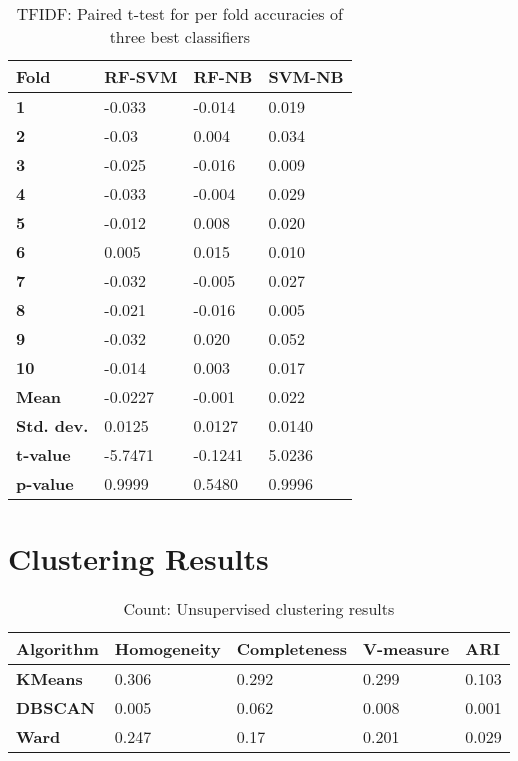 \documentclass{article}
\begin{document}
\begin{table}[h]
\begin{tabular}{llll}
\textbf{Fold}      & \textbf{RF-SVM} & \textbf{RF-NB} & \textbf{SVM-NB} \\ \hline
\textbf{1}         & -0.033          & -0.014         & 0.019           \\
\textbf{2}         & -0.03           & 0.004          & 0.034           \\
\textbf{3}         & -0.025          & -0.016         & 0.009           \\
\textbf{4}         & -0.033          & -0.004         & 0.029           \\
\textbf{5}         & -0.012          & 0.008          & 0.020           \\
\textbf{6}         & 0.005           & 0.015          & 0.010           \\
\textbf{7}         & -0.032          & -0.005         & 0.027           \\
\textbf{8}         & -0.021          & -0.016         & 0.005           \\
\textbf{9}         & -0.032          & 0.020          & 0.052           \\
\textbf{10}        & -0.014          & 0.003          & 0.017           \\ \hline
\textbf{Mean}      & -0.0227         & -0.001         & 0.022           \\ \hline
\textbf{Std. dev.} & 0.0125          & 0.0127         & 0.0140          \\ \hline
\textbf{t-value}   & -5.7471         & -0.1241        & 5.0236          \\ \hline
\textbf{p-value}   & 0.9999          & 0.5480         & 0.9996         
\end{tabular}
\caption{TFIDF: Paired t-test for per fold accuracies of three best classifiers}
\end{table}

\section{Clustering Results}
\begin{table}[h]
\begin{tabular}{l|llll}
\textbf{Algorithm} & \textbf{Homogeneity} & \textbf{Completeness} & \textbf{V-measure} & \textbf{ARI} \\ \hline
\textbf{KMeans}    & 0.306                & 0.292                 & 0.299              & 0.103                        \\
\textbf{DBSCAN}    & 0.005                & 0.062                 & 0.008              & 0.001                        \\
\textbf{Ward}      & 0.247                & 0.17                  & 0.201              & 0.029                       
\end{tabular}
\caption{Count: Unsupervised clustering results}
\end{table}
\end{document}
